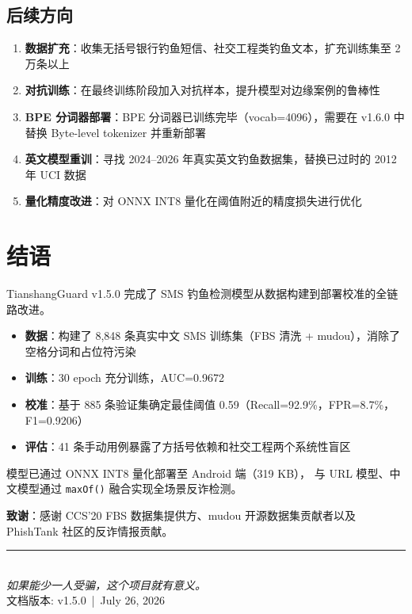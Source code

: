 \documentclass[11pt,a4paper]{article}
\begin{document}
\subsection{后续方向}

\begin{enumerate}
  \item \textbf{数据扩充}：收集无括号银行钓鱼短信、社交工程类钓鱼文本，扩充训练集至 2 万条以上
  \item \textbf{对抗训练}：在最终训练阶段加入对抗样本，提升模型对边缘案例的鲁棒性
  \item \textbf{BPE 分词器部署}：BPE 分词器已训练完毕（vocab=4096），需要在 v1.6.0 中替换 Byte-level tokenizer 并重新部署
  \item \textbf{英文模型重训}：寻找 2024--2026 年真实英文钓鱼数据集，替换已过时的 2012 年 UCI 数据
  \item \textbf{量化精度改进}：对 ONNX INT8 量化在阈值附近的精度损失进行优化
\end{enumerate}

\section{结语}

TianshangGuard v1.5.0 完成了 SMS 钓鱼检测模型从数据构建到部署校准的全链路改进。

\begin{itemize}
  \item \textbf{数据}：构建了 8,848 条真实中文 SMS 训练集（FBS 清洗 + mudou），消除了空格分词和占位符污染
  \item \textbf{训练}：30 epoch 充分训练，AUC=0.9672
  \item \textbf{校准}：基于 885 条验证集确定最佳阈值 0.59（Recall=92.9\%，FPR=8.7\%，F1=0.9206）
  \item \textbf{评估}：41 条手动用例暴露了方括号依赖和社交工程两个系统性盲区
\end{itemize}

模型已通过 ONNX INT8 量化部署至 Android 端（319 KB），
与 URL 模型、中文模型通过 \texttt{maxOf()} 融合实现全场景反诈检测。

\textbf{致谢}：感谢 CCS'20 FBS 数据集提供方、mudou 开源数据集贡献者以及
PhishTank 社区的反诈情报贡献。

\vspace{0.5cm}
\begin{center}
\rule{0.3\textwidth}{0.5pt}\\
{\small\color{primaryblue} \textit{如果能少一人受骗，这个项目就有意义。}}\\
{\small 文档版本: v1.5.0 \,|\, July 26, 2026}
\end{center}
\end{document}
